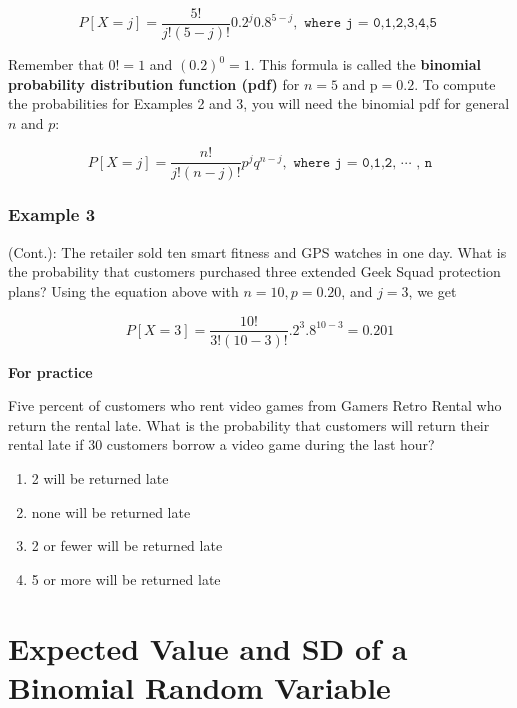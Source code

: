 \documentclass[11pt, chapterprefix=true]{scrbook}\usepackage[]{graphicx}\usepackage[]{color}
\begin{document}
\begin{equation*}
 P[ X = j] = \frac{5!}{j! (5 - j)!} 0.2^j 0.8^{5 - j}, \texttt{ where j = 0,1,2,3,4,5 }
 \end{equation*}

Remember that $0! = 1$ and $(0.2)^0 = 1$.  This formula is called the \textbf{binomial probability distribution function (pdf)} for $n = 5$ and p$ = 0.2$.  To compute the probabilities for Examples 2 and 3, you will need the binomial pdf for general $n$ and $p$:

\begin{equation*}
 P[ X = j] = \frac{n!}{j! (n - j)!} p^j q^{n - j}, \texttt{ where j = 0,1,2, $\cdots$ , n}
 \end{equation*}


\subsubsection{Example 3} (Cont.):  The retailer sold ten smart fitness and GPS watches in one day.  What is the probability that customers purchased three extended Geek Squad protection plans?  Using the equation above with $n = 10, p = 0.20$, and $j = 3$, we get

\begin{equation*}
 P[ X = 3] = \frac{10!}{3! (10 - 3)!} .2^3 .8^{10 - 3} = 0.201
 \end{equation*}

\begin{minipage}[ht]{3cm}

\textbf{For practice}
\end{minipage}
\begin{minipage}[ht]{12cm}

Five percent of customers who rent video games from Gamers Retro Rental who return the rental late.  What is the probability that customers will return their rental late if 30 customers borrow a video game during the last hour?

\begin{enumerate}
\item 2 will be returned late
\item none will be returned late
\item 2 or fewer will be returned late
\item 5 or more will be returned late
\end{enumerate}
\end{minipage}

\section{Expected Value and SD of a Binomial Random Variable}
\end{document}
